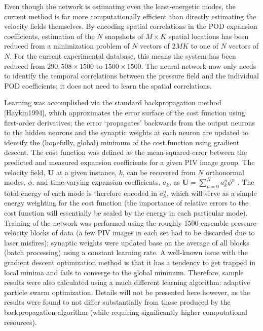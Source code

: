 Even though the network is estimating even the least-energetic modes, the current method is far more computationally efficient than directly estimating the velocity fields themselves.
By encoding spatial correlations in the POD expansion coefficients, estimation of the $N$ snapshots of $M \times K$ spatial locations has been reduced from a minimization problem of $N$ vectors of $2MK$ to one of $N$ vectors of $N$.
For the current experimental database, this means the system has been reduced from $290,508 \times 1500$ to $1500 \times 1500$.
The neural network now only needs to identify the temporal correlations between the pressure field and the individual POD coefficients; it does not need to learn the spatial correlations.

Learning was accomplished via the standard backpropagation method [Haykin1994], which approximates the error surface of the cost function using first-order derivatives; the error `propagates' backwards from the output neurons to the hidden neurons and the synaptic weights at each neuron are updated to identify the (hopefully, global) minimum of the cost function using gradient descent.
The cost function was defined as the mean-squared-error between the predicted and measured expansion coefficients for a given PIV image group.
The velocity field, $\mathbf{U}$ at a given instance, $k$, can be recovered from $N$ orthonormal modes, $\phi$, and time-varying expansion coefficients, $a_k$, as $\mathbf{U} = \sum_{n=0}^{N} a_{k}^{n} \phi^n$ \citep{Berkooz1993}.
The total energy of each mode is therefore encoded in $a_k^n$, which will serve as a simple energy weighting for the cost function (the importance of relative errors to the cost function will essentially be scaled by the energy in each particular mode).
Training of the network was performed using the roughly 1500 ensemble pressure-velocity blocks of data (a few PIV images in each set had to be discarded due to laser misfires); synaptic weights were updated base on the average of all blocks (batch processing) using a constant learning rate.
A well-known issue with the gradient descent optimization method is that it has a tendency to get trapped in local minima and fails to converge to the global minimum.
Therefore, sample results were also calculated using a much different learning algorithm: adaptive particle swarm optimization.
Details will not be presented here however, as the results were found to not differ substantially from those produced by the backpropagation algorithm (while requiring significantly higher computational resources).

